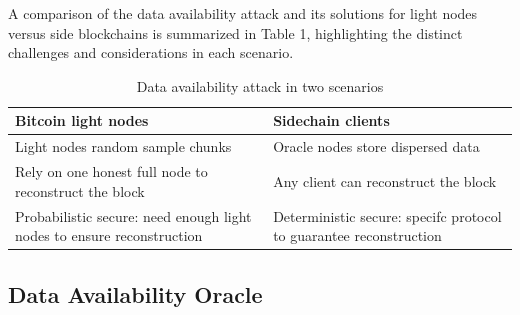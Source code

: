 A comparison of the data availability attack and its solutions for light nodes versus side blockchains is summarized in Table 1, highlighting the distinct challenges and considerations in each scenario.
\begin{table}[htbp]
	\centering
	\captionsetup{justification=centering}
	\caption[position=above]{Data availability attack in two scenarios}
	\begin{tabular}{|>{\centering\arraybackslash}p{8cm}|>{\centering\arraybackslash}p{8cm}|}
		\hline
		Bitcoin light nodes & Sidechain clients\\
		\hline
		Light nodes random sample chunks & Oracle nodes store dispersed data \\
		\hline
		Rely on one honest full node to	reconstruct the block & Any client can reconstruct the block \\
		\hline
		Probabilistic secure: need enough light nodes to ensure reconstruction & Deterministic secure: specifc protocol to guarantee reconstruction \\
		\hline
	\end{tabular}
\end{table}
\subsection{Data Availability Oracle}

